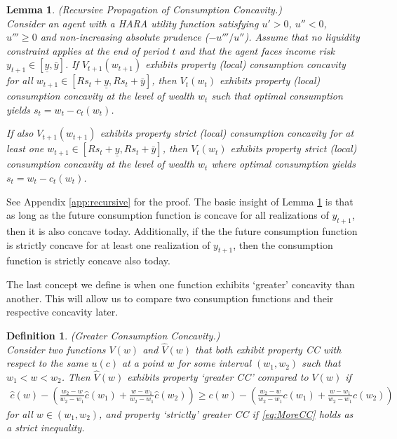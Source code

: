 \documentclass[titlepage]{\econtex}
\newtheorem{defn}{Definition}
\newtheorem{lemma}{Lemma}
\begin{document}
  \begin{lemma}\label{lem:recursive}(Recursive Propagation of Consumption Concavity.) \\
    Consider an agent with a HARA utility function satisfying $u' > 0$, $u'' < 0$, $u''' \geq 0$ and non-increasing absolute prudence ($-u'''/u''$). Assume that no liquidity constraint applies at the end of period $t$ and that the agent faces income risk $y_{t+1} \in [\underline{y},\bar{y}]$. If $V_{t+1}(w_{t+1})$ exhibits property (local) consumption concavity for all $w_{t+1} \in [Rs_t + \underline{y}, Rs_t + \bar{y}]$, then $V_t(w_t)$ exhibits property (local) consumption concavity at the level of wealth $w_t$ such that optimal consumption yields $s_t = w_t - c_t(w_t)$.
    
    \medskip
    \noindent If also $V_{t+1}(w_{t+1})$ exhibits property strict (local) consumption concavity for at least one $w_{t+1} \in [Rs_t + \underline{y}, Rs_t + \bar{y}]$, then $V_t(w_t)$ exhibits property strict (local) consumption concavity at the level of wealth $w_t$ where optimal consumption yields $s_t = w_t - c_t(w_t)$.
  \end{lemma}
  \noindent See Appendix \ref{app:recursive} for the proof. The basic insight of Lemma \ref{lem:recursive} is that as long as the future consumption function is concave for all realizations of $y_{t+1}$, then it is also concave today. Additionally, if the the future consumption function is strictly concave for at least one realization of ${y}_{t+1}$, then the consumption function is strictly concave also today. 


  The last concept we define is when one function exhibits `greater' concavity than another. This will allow us to compare two consumption functions and their respective concavity later. 
  \begin{defn}\label{defn:MoreCC} (Greater Consumption Concavity.) \\ Consider two functions $V(w)$ and $\hat{V}(w)$ that both exhibit property CC with respect to the same $u(c)$ at a point $w$ for some interval $(w_1,w_2)$ such that $w_1 < w < w_2$.  Then $\hat{V}(w)$ exhibits property `greater CC' compared to $V(w)$ if
    \begin{eqnarray}
      \hat{c}(w) - \left(\frac{w_{2}-w}{w_{2}-w_{1}} \hat{c}(w_{1})+\frac{w-w_{1}}{w_{2}-w_{1}}\hat{c}(w_{2})\right) \geq c(w) - \left(\frac{w_{2}-w}{w_{2}-w_{1}} c(w_{1})+\frac{w-w_{1}}{w_{2}-w_{1}}c(w_{2})\right) \label{eq:MoreCC}
    \end{eqnarray}
    for all $w \in (w_{1},w_{2})$, and property `strictly' greater CC if \eqref{eq:MoreCC}
    holds as a strict inequality.
  \end{defn}
\end{document}
